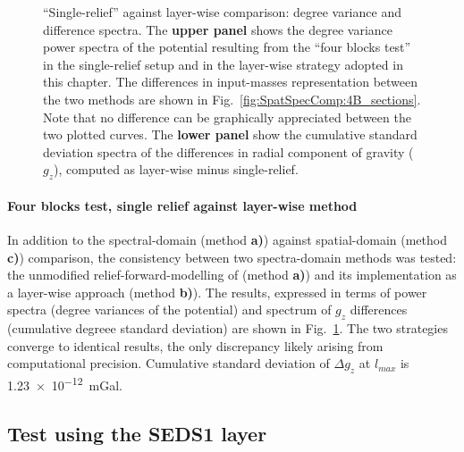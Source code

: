 \begin{subappendices}
\begin{figure} %
    \begin{adjustbox}{center}
    \end{adjustbox}
    \caption[``Single-relief'' against layer-wise comparison: degree variance and difference spectra.]{
        ``Single-relief'' against layer-wise comparison: degree variance and difference spectra.
        The \textbf{upper panel} shows the degree variance power spectra of the potential resulting from the ``four blocks test'' in the single-relief setup \parencite[unmodified method of][]{Wieczorek2007} and in the layer-wise strategy adopted in this chapter.
        The differences in input-masses representation between the two methods are shown in Fig.~\ref{fig:SpatSpecComp:4B_sections}.
        Note that no difference can be graphically appreciated between the two plotted curves.
        The \textbf{lower panel} show the cumulative standard deviation spectra of the differences in radial component of gravity ($g_z$), computed as layer-wise minus single-relief.}
    \label{fig:SpatSpecComp:4B_dv_spec_relief}
\end{figure}

\paragraph*{Four blocks test, single relief against layer-wise method}
In addition to the spectral-domain (method \textbf{a)}) against spatial-domain (method \textbf{c)}) comparison, the consistency between two spectra-domain methods was tested: the unmodified relief-forward-modelling of \textcite{Wieczorek2007} (method \textbf{a)}) and its implementation as a layer-wise approach (method \textbf{b)}).
The results, expressed in terms of power spectra (degree variances of the potential) and spectrum of $g_z$ differences (cumulative degreee standard deviation) are shown in Fig.~\ref{fig:SpatSpecComp:4B_dv_spec_relief}.
The two strategies converge to identical results, the only discrepancy likely arising from computational precision.
Cumulative standard deviation of $\Delta g_z$ at $l_{max}$ is \SI{1.23e-12}{\milli Gal}.

\subsection{Test using the SEDS1 layer}
\label{ss:SigIs:Test:SEDS1}


\end{subappendices}
